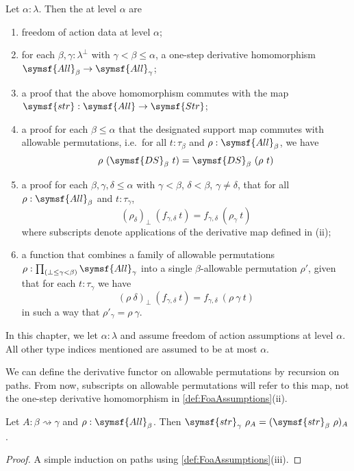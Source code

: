 \begin{definition}
    \label{def:FoaAssumptions}
    Let \( \alpha : \lambda \).
    Then the  at level \( \alpha \) are
    \begin{enumerate}
        \item freedom of action data at level \( \alpha \);
        \item for each \( \beta, \gamma : \lambda^\bot \) with \( \gamma < \beta \leq \alpha \), a one-step derivative homomorphism \( \symsf{All}_\beta \to \symsf{All}_\gamma \);
        \item a proof that the above homomorphism commutes with the map \( \symsf{str} : \symsf{All} \to \symsf{Str} \);
        \item a proof for each \( \beta \leq \alpha \) that the designated support map commutes with allowable permutations, i.e.\ for all \( t : \tau_\beta \) and \( \rho : \symsf{All}_\beta \), we have
        \[ \rho\ (\symsf{DS}_\beta\ t) = \symsf{DS}_\beta\ (\rho\ t) \]
        \item a proof for each \( \beta, \gamma, \delta \leq \alpha \) with \( \gamma < \beta \), \( \delta < \beta \), \( \gamma \neq \delta \), that for all \( \rho : \symsf{All}_\beta \) and \( t : \tau_\gamma \),
        \[ (\rho_\delta)_\bot\ (f_{\gamma,\delta}\ t) = f_{\gamma,\delta}\ (\rho_\gamma\ t) \]
        where subscripts denote applications of the derivative map defined in (ii);
        \item a function that combines a family of allowable permutations \( \rho : \prod_{(\bot \leq \gamma < \beta)} \symsf{All}_\gamma \) into a single \( \beta \)-allowable permutation \( \rho' \), given that for each \( t : \tau_\gamma \) we have
        \[ (\rho\ \delta)_\bot\ (f_{\gamma,\delta}\ t) = f_{\gamma,\delta}\ (\rho\ \gamma\ t) \]
        in such a way that \( \rho'_\gamma = \rho\ \gamma \).
    \end{enumerate}
\end{definition}
In this chapter, we let \( \alpha : \lambda \) and assume freedom of action assumptions at level \( \alpha \).
All other type indices mentioned are assumed to be at most \( \alpha \).
\begin{definition}
    We can define the derivative functor on allowable permutations by recursion on paths.
    From now, subscripts on allowable permutations will refer to this map, not the one-step derivative homomorphism in \cref{def:FoaAssumptions}(ii).
\end{definition}
\begin{lemma}
    \label{lem:toStructPerm_comp}
    Let \( A : \beta \rightsquigarrow \gamma \) and \( \rho : \symsf{All}_\beta \).
    Then \( \symsf{str}_\gamma\ \rho_A = (\symsf{str}_\beta\ \rho)_A \).
\end{lemma}
\begin{proof}
    A simple induction on paths using \cref{def:FoaAssumptions}(iii).
\end{proof}
